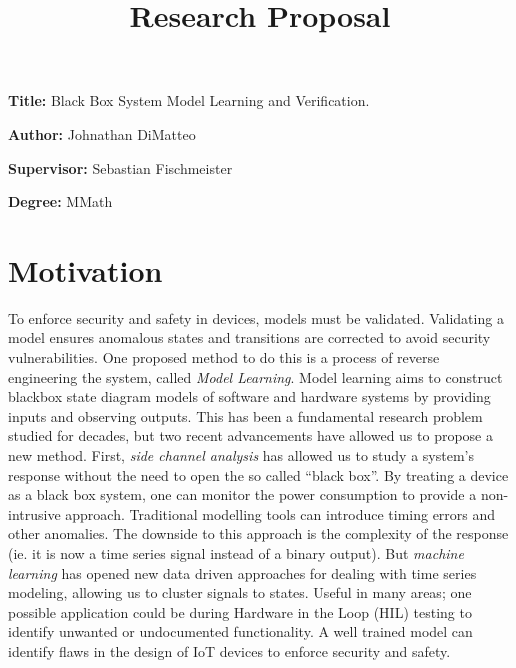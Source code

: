 \documentclass[11pt, a4paper]{article}
\title{Research Proposal}
\author{}
\date{}
\newcommand{\namelistlabel}[1]{\mbox{#1}\hfil}
\newenvironment{namelist}[1]{%
\begin{list}{}
    {
        \let\makelabel\namelistlabel
        \settowidth{\labelwidth}{#1}
        \setlength{\leftmargin}{1.1\labelwidth}
    }
  }{%
\end{list}}
\begin{document}
\maketitle

\begin{namelist}{xxxxxxxxxxxx}
\item[{\bf Title:}]
	Black Box System Model Learning and Verification.
\item[{\bf Author:}]
	Johnathan DiMatteo
\item[{\bf Supervisor:}]
	Sebastian Fischmeister
\item[{\bf Degree:}]
	MMath
\end{namelist}

\section*{Motivation} 


To enforce security and safety in devices, models must be validated.
Validating a model ensures anomalous states and transitions are corrected to avoid security vulnerabilities.
One proposed method to do this is a process of reverse engineering the system, called \textit{Model Learning}.
Model learning aims to construct blackbox state diagram models of software and hardware systems by providing inputs and observing outputs.
This has been a fundamental research problem studied for decades, but two recent advancements have allowed us to propose a new method.
First, \textit{side channel analysis} has allowed us to study a system's response without the need to open the so called ``black box''.
By treating a device as a black box system, one can monitor the power consumption to provide a non-intrusive approach.
Traditional modelling tools can introduce timing errors and other anomalies. 
The downside to this approach is the complexity of the response (ie. it is now a time series signal instead of a binary output).
But \textit{machine learning} has opened new data driven approaches for dealing with time series modeling, allowing us to cluster signals to states.
Useful in many areas;
one possible application could be during Hardware in the Loop (HIL) testing to identify unwanted or undocumented functionality.
A well trained model can identify flaws in the design of IoT devices to enforce security and safety.
\end{document}

